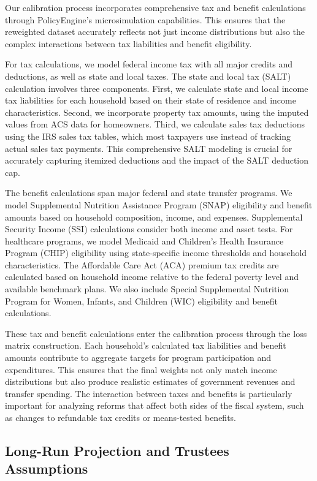 Our calibration process incorporates comprehensive tax and benefit calculations through PolicyEngine's microsimulation capabilities. This ensures that the reweighted dataset accurately reflects not just income distributions but also the complex interactions between tax liabilities and benefit eligibility.

For tax calculations, we model federal income tax with all major credits and deductions, as well as state and local taxes. The state and local tax (SALT) calculation involves three components. First, we calculate state and local income tax liabilities for each household based on their state of residence and income characteristics. Second, we incorporate property tax amounts, using the imputed values from ACS data for homeowners. Third, we calculate sales tax deductions using the IRS sales tax tables, which most taxpayers use instead of tracking actual sales tax payments. This comprehensive SALT modeling is crucial for accurately capturing itemized deductions and the impact of the SALT deduction cap.

The benefit calculations span major federal and state transfer programs. We model Supplemental Nutrition Assistance Program (SNAP) eligibility and benefit amounts based on household composition, income, and expenses. Supplemental Security Income (SSI) calculations consider both income and asset tests. For healthcare programs, we model Medicaid and Children's Health Insurance Program (CHIP) eligibility using state-specific income thresholds and household characteristics. The Affordable Care Act (ACA) premium tax credits are calculated based on household income relative to the federal poverty level and available benchmark plans. We also include Special Supplemental Nutrition Program for Women, Infants, and Children (WIC) eligibility and benefit calculations.

These tax and benefit calculations enter the calibration process through the loss matrix construction. Each household's calculated tax liabilities and benefit amounts contribute to aggregate targets for program participation and expenditures. This ensures that the final weights not only match income distributions but also produce realistic estimates of government revenues and transfer spending. The interaction between taxes and benefits is particularly important for analyzing reforms that affect both sides of the fiscal system, such as changes to refundable tax credits or means-tested benefits.

\subsection{Long-Run Projection and Trustees Assumptions}

